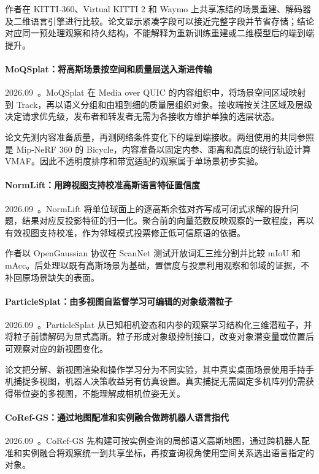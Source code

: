 作者在 KITTI-360、Virtual KITTI 2 和 Waymo 上共享冻结的场景重建、解码器及二维语言引擎进行比较。论文显示紧凑字段可以接近完整字段并节省存储；结论对应同一预处理观察和持久结构，不能解释为重新训练重建或二维模型后的端到端提升。

\paragraph{MoQSplat：将高斯场景按空间和质量层送入渐进传输}
2026.09~\cite{2609_18624}。MoQSplat 在 Media over QUIC 的内容组织中，将场景空间区域映射到 Track，再以语义分组和由粗到细的质量层组织对象。接收端按关注区域及层级决定请求优先级，发布者和转发者无需为各接收方维护单独的选层状态。

论文先测内容准备质量，再测网络条件变化下的端到端接收。两组使用的共同参照是 Mip-NeRF 360 的 Bicycle，内容准备以固定内参、距离和高度的绕行轨迹计算 VMAF。因此不透明度排序和带宽适配的观察属于单场景初步实验。

\paragraph{NormLift：用跨视图支持校准高斯语言特征置信度}
2026.09~\cite{2609_18898}。NormLift 将单位球面上的逐高斯余弦对齐写成可闭式求解的提升问题，结果对应反投影特征的归一化。聚合前的向量范数反映观察的一致程度，再以有效视图支持校准，作为邻域模式投票修正低可信原语的依据。

作者以 OpenGaussian 协议在 ScanNet 测试开放词汇三维分割并比较 mIoU 和 mAcc。后处理以既有高斯场景为基础，置信度与投票利用观察和邻域的证据，不补回原场景缺失的表面。

\paragraph{ParticleSplat：由多视图自监督学习可编辑的对象级潜粒子}
2026.09~\cite{2609_19463}。ParticleSplat 从已知相机姿态和内参的观察学习结构化三维潜粒子，并将粒子前馈解码为显式高斯。粒子形成对象级控制接口，改变对象潜变量或位置后可观察对应的新视图变化。

论文把分解、新视图渲染和操作学习分为不同实验，其中真实桌面场景使用手持手机捕捉多视图，机器人决策收益另有仿真设置。真实捕捉无需固定多机阵列仍需获得带位姿的多视图，不能理解成相机位姿无关。

\paragraph{CoRef-GS：通过地图配准和实例融合做跨机器人语言指代}
2026.09~\cite{2609_20586}。CoRef-GS 先构建可按实例查询的局部语义高斯地图，通过跨机器人配准和实例融合将观察统一到共享坐标，再按查询视角使用空间关系选出语言指定的对象。

